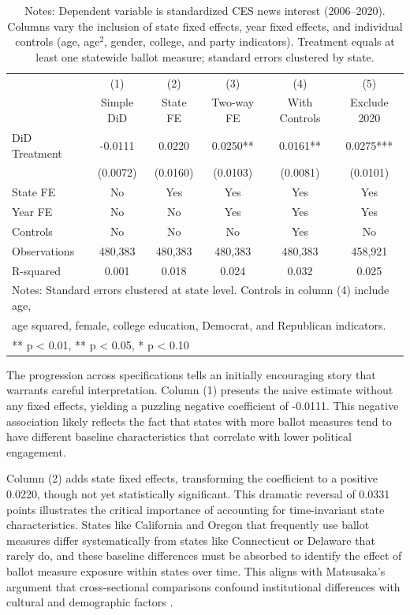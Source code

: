 \documentclass[12pt,letterpaper,oneside]{book}
\begin{document}
\begin{table}[H]
\centering
\caption{DiD Estimates Using All Ballot Measures}
\label{tab:did_results_all}
\caption*{\footnotesize Notes: Dependent variable is standardized CES news interest (2006--2020). Columns vary the inclusion of state fixed effects, year fixed effects, and individual controls (age, age$^2$, gender, college, and party indicators). Treatment equals at least one statewide ballot measure; standard errors clustered by state.}
\begin{tabular}{lccccc}
\hline\hline
& (1) & (2) & (3) & (4) & (5) \\
& Simple DiD & State FE & Two-way FE & With Controls & Exclude 2020 \\
\hline
DiD Treatment & -0.0111 & 0.0220 & 0.0250** & 0.0161** & 0.0275*** \\
& (0.0072) & (0.0160) & (0.0103) & (0.0081) & (0.0101) \\
State FE & No & Yes & Yes & Yes & Yes \\
Year FE & No & No & Yes & Yes & Yes \\
Controls & No & No & No & Yes & No \\
\hline
Observations & 480,383 & 480,383 & 480,383 & 480,383 & 458,921 \\
R-squared & 0.001 & 0.018 & 0.024 & 0.032 & 0.025 \\
\hline\hline
\multicolumn{6}{l}{\footnotesize Notes: Standard errors clustered at state level. Controls in column (4) include age,} \\
\multicolumn{6}{l}{\footnotesize age squared, female, college education, Democrat, and Republican indicators.} \\
\multicolumn{6}{l}{\footnotesize *** p < 0.01, ** p < 0.05, * p < 0.10} \\
\end{tabular}
\end{table}

The progression across specifications tells an initially encouraging story that warrants careful interpretation. Column (1) presents the naive estimate without any fixed effects, yielding a puzzling negative coefficient of -0.0111. This negative association likely reflects the fact that states with more ballot measures tend to have different baseline characteristics that correlate with lower political engagement.

Column (2) adds state fixed effects, transforming the coefficient to a positive 0.0220, though not yet statistically significant. This dramatic reversal of 0.0331 points illustrates the critical importance of accounting for time-invariant state characteristics. States like California and Oregon that frequently use ballot measures differ systematically from states like Connecticut or Delaware that rarely do, and these baseline differences must be absorbed to identify the effect of ballot measure exposure within states over time. This aligns with Matsusaka's argument that cross-sectional comparisons confound institutional differences with cultural and demographic factors \citep{matsusaka2004many}.
\end{document}
